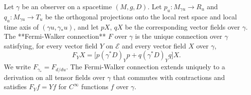 Let $\gamma$ be an observer on a spacetime $(M, g, D)$. Let $p_u: M_{\gamma u} \to R_u$ and $q_u: M_{\gamma u} \to T_u$ be the orthogonal projections onto the local rest space and local time axis of $(\gamma u, \gamma_* u)$, and let $pX$, $qX$ be the corresponding vector fields over $\gamma$. The **Fermi-Walker connection** $F$ over $\gamma$ is the unique connection over $\gamma$ satisfying, for every vector field $Y$ on $\mathcal{E}$ and every vector field $X$ over $\gamma$,
$$F_Y X = \bigl[p(\gamma^* D)_Y p + q(\gamma^* D)_Y q\bigr] X.$$
We write $F_{\gamma_*} = F_{d/du}$. The Fermi-Walker connection extends uniquely to a derivation on all tensor fields over $\gamma$ that commutes with contractions and satisfies $F_Y f = Yf$ for $C^\infty$ functions $f$ over $\gamma$.
